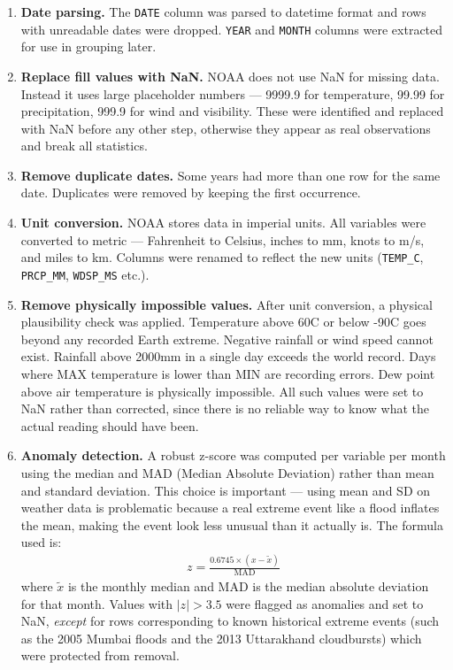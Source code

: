 \begin{enumerate}

    \item \textbf{Date parsing.}
    The \texttt{DATE} column was parsed to datetime format and rows with
    unreadable dates were dropped. \texttt{YEAR} and \texttt{MONTH} columns
    were extracted for use in grouping later.

    \item \textbf{Replace fill values with NaN.}
    NOAA does not use NaN for missing data. Instead it uses large placeholder
    numbers --- 9999.9 for temperature, 99.99 for precipitation, 999.9 for
    wind and visibility. These were identified and replaced with NaN before
    any other step, otherwise they appear as real observations and break
    all statistics.

    \item \textbf{Remove duplicate dates.}
    Some years had more than one row for the same date. Duplicates were
    removed by keeping the first occurrence.

    \item \textbf{Unit conversion.}
    NOAA stores data in imperial units. All variables were converted to
    metric --- Fahrenheit to Celsius, inches to mm, knots to m/s, and miles
    to km. Columns were renamed to reflect the new units
    (\texttt{TEMP\_C}, \texttt{PRCP\_MM}, \texttt{WDSP\_MS} etc.).

    \item \textbf{Remove physically impossible values.}
    After unit conversion, a physical plausibility check was applied.
    Temperature above 60\textdegree C or below -90\textdegree C goes beyond
    any recorded Earth extreme. Negative rainfall or wind speed cannot exist.
    Rainfall above 2000mm in a single day exceeds the world record.
    Days where MAX temperature is lower than MIN are recording errors.
    Dew point above air temperature is physically impossible.
    All such values were set to NaN rather than corrected, since there is
    no reliable way to know what the actual reading should have been.

    \item \textbf{Anomaly detection.}
    A robust z-score was computed per variable per month using the median
    and MAD (Median Absolute Deviation) rather than mean and standard
    deviation. This choice is important --- using mean and SD on weather
    data is problematic because a real extreme event like a flood inflates
    the mean, making the event look less unusual than it actually is.
    The formula used is:
    \begin{align}
        z = \frac{0.6745 \times (x - \tilde{x})}{\mathrm{MAD}}
        \label{eq:zscore}
    \end{align}
    where $\tilde{x}$ is the monthly median and MAD is the median absolute
    deviation for that month. Values with $|z| > 3.5$ were flagged as
    anomalies and set to NaN, \emph{except} for rows corresponding to known
    historical extreme events (such as the 2005 Mumbai floods and the 2013
    Uttarakhand cloudbursts) which were protected from removal.


\end{enumerate}
